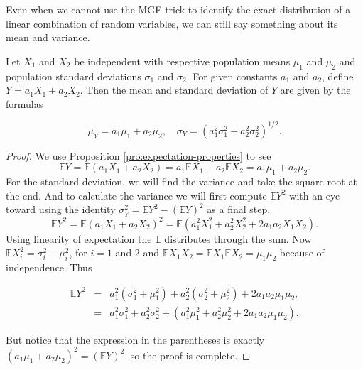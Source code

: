 \documentclass[]{book}
\numberwithin{equation}{chapter}
\numberwithin{figure}{chapter}
\theoremstyle{plain}
\theoremstyle{definition}
\theoremstyle{remark}
\theoremstyle{definition}
\theoremstyle{definition}
\theoremstyle{remark}
\let\BeginKnitrBlock\begin \let\EndKnitrBlock\end
\begin{document}
Even when we cannot use the MGF trick to identify the exact distribution
of a linear combination of random variables, we can still say something
about its mean and variance.

\bigskip

\BeginKnitrBlock{proposition}
\protect\hypertarget{prp:mean-sd-lin-comb-two}{}{\label{prp:mean-sd-lin-comb-two}}Let
\(X_{1}\) and \(X_{2}\) be independent with respective population means
\(\mu_{1}\) and \(\mu_{2}\) and population standard deviations
\(\sigma_{1}\) and \(\sigma_{2}\). For given constants \(a_{1}\) and
\(a_{2}\), define \(Y=a_{1}X_{1}+a_{2}X_{2}\). Then the mean and
standard deviation of \(Y\) are given by the formulas

\begin{equation}
\mu_{Y}=a_{1}\mu_{1}+a_{2}\mu_{2},\quad \sigma_{Y}=\left(a_{1}^{2}\sigma_{1}^{2}+a_{2}^{2}\sigma_{2}^{2}\right)^{1/2}.
\end{equation}
\EndKnitrBlock{proposition}

\bigskip

\BeginKnitrBlock{proof}
\iffalse {Proof. } \fi We use Proposition
\ref{pro:expectation-properties} to see \[ 
\mathbb{E}
Y=\mathbb{E}\left(a_{1}X_{1}+a_{2}X_{2}\right)=a_{1}\mathbb{E}X_{1}+a_{2}\mathbb{E} X_{2}=a_{1}\mu_{1}+a_{2}\mu_{2}.
\] For the standard deviation, we will find the variance and take the
square root at the end. And to calculate the variance we will first
compute \(\mathbb{E} Y^{2}\) with an eye toward using the identity
\(\sigma_{Y}^{2}=\mathbb{E} Y^{2}-\left(\mathbb{E} Y\right)^{2}\) as a
final step. \[ \mathbb{E}
Y^{2}=\mathbb{E}\left(a_{1}X_{1}+a_{2}X_{2}\right)^{2}=\mathbb{E}\left(a_{1}^{2}X_{1}^{2}+a_{2}^{2}X_{2}^{2}+2a_{1}a_{2}X_{1}X_{2}\right).
\] Using linearity of expectation the \(\mathbb{E}\) distributes through
the sum. Now \(\mathbb{E} X_{i}^{2}=\sigma_{i}^{2}+\mu_{i}^{2}\), for
\(i=1\) and 2 and
\(\mathbb{E} X_{1}X_{2}=\mathbb{E} X_{1}\mathbb{E} X_{2}=\mu_{1}\mu_{2}\)
because of independence. Thus

\begin{eqnarray*}
\mathbb{E} Y^{2} & = & a_{1}^{2}(\sigma_{1}^{2}+\mu_{1}^{2})+a_{2}^{2}(\sigma_{2}^{2}+\mu_{2}^{2})+2a_{1}a_{2}\mu_{1}\mu_{2},\\
 & = & a_{1}^{2}\sigma_{1}^{2}+a_{2}^{2}\sigma_{2}^{2}+\left(a_{1}^{2}\mu_{1}^{2}+a_{2}^{2}\mu_{2}^{2}+2a_{1}a_{2}\mu_{1}\mu_{2}\right).
\end{eqnarray*}

But notice that the expression in the parentheses is exactly
\(\left(a_{1}\mu_{1}+a_{2}\mu_{2}\right)^{2}=\left(\mathbb{E} Y\right)^{2}\),
so the proof is complete.
\EndKnitrBlock{proof}
\end{document}
